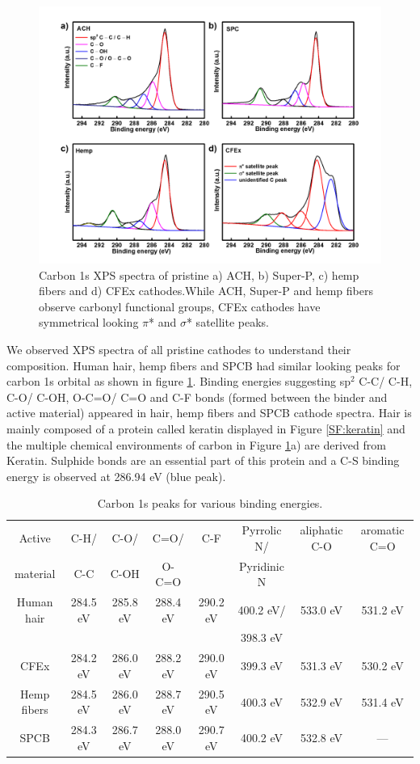 \documentclass{article}
\begin{document}
\begin{figure}[tbh!]
  \centering
  \includegraphics[width=\textwidth]{figures/XPSC}
    \caption{Carbon 1s XPS spectra of pristine a) ACH, b) Super-P, c) hemp fibers and d) CFEx cathodes.While ACH, Super-P and hemp fibers observe carbonyl functional groups, CFEx cathodes have symmetrical looking $\pi$* and $\sigma$* satellite peaks.}
  \label{figures:XPSC}
\end{figure}

We observed XPS spectra of all pristine cathodes to understand their composition. Human hair, hemp fibers and SPCB had similar looking peaks for carbon 1s orbital as shown in figure \ref{figures:XPSC}. Binding energies suggesting sp$^2$ C-C/ C-H, C-O/ C-OH, O-C=O/ C=O and C-F bonds (formed between the binder and active material) appeared in hair, hemp fibers and SPCB cathode spectra. Hair is mainly composed of a protein called keratin displayed in Figure \ref{SF:keratin} and the multiple chemical environments of carbon in Figure \ref{figures:XPSC}a) are derived from Keratin. Sulphide bonds are an essential part of this protein and a C-S binding energy is observed at 286.94 eV (blue peak).

\begin{table}
\caption{Carbon 1s peaks for various binding energies.} \label{table2}
\begin{tabular}{|cccccccc|}
\hline
Active & C-H/ & C-O/ & C=O/ & C-F & Pyrrolic N/ & aliphatic C-O & aromatic C=O\\
material & C-C & C-OH & O-C=O & & Pyridinic N & & \\
\hline
Human hair & 284.5 eV & 285.8 eV & 288.4 eV & 290.2 eV & 400.2 eV/ & 533.0 eV & 531.2 eV\\
& & & & & 398.3 eV & & \\
CFEx & 284.2 eV & 286.0 eV & 288.2 eV & 290.0 eV & 399.3 eV & 531.3 eV & 530.2 eV\\
Hemp fibers & 284.5 eV & 286.0 eV & 288.7 eV & 290.5 eV & 400.3 eV & 532.9 eV & 531.4 eV\\
SPCB & 284.3 eV & 286.7 eV & 288.0 eV & 290.7 eV & 400.2 eV & 532.8 eV & ---\\
\hline
\end{tabular}
\end{table}
\end{document}
